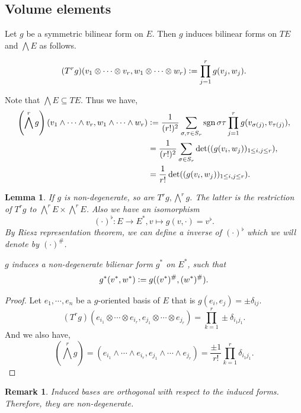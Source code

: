 \documentclass[8pt]{article}
\newtheorem{lemma}{Lemma}[section]
\newtheorem{remark}{Remark}[section]
\DeclareMathOperator{\sgn}{sgn}
\newcommand{\defeq}{\vcentcolon=}
\begin{document}
\subsection{Volume elements}
Let $g$ be a symmetric bilinear form on $E$. Then $g$ induces bilinear forms on $TE$ and $\bigwedge E$ as follows. 

\begin{equation*}
  (T^rg)(v_1\otimes\cdots\otimes v_r,w_1\otimes\cdots\otimes w_r) \defeq \prod_{j=1}^rg(v_j,w_j).
\end{equation*}

Note that $\bigwedge E\subseteq TE$. Thus we have,
\begin{align*}
  \left(\bigwedge^rg\right)(v_1\wedge\cdots\wedge v_r, w_1\wedge\cdots\wedge w_r) &\defeq {\frac 1 {(r!)^2}}\sum_{\sigma,\tau\in S_r}\sgn\sigma\tau\prod_{j=1}^rg(v_{\sigma(j)},v_{\tau(j)}),\\
  & = {\frac 1 {(r!)^2}}\sum_{\sigma\in S_r}\det((g(v_i,w_j))_{1\leq i,j\leq r}),\\
  & = {\frac 1 {r!}}\det((g(v_i,w_j))_{1\leq i,j\leq r}).
\end{align*}

\begin{lemma}
  \label{lemma_11_5}
  If $g$ is non-degenerate, so are $T^rg,\bigwedge^rg$. The latter is the restriction of $T^r g$ to $\bigwedge^r E\times\bigwedge^r E$. Also we have an isomorphism 
  \begin{equation*}
    (\cdot)^\flat:E\to E^*,v\mapsto g(v,\cdot) = v^\flat.
  \end{equation*}
   By Riesz representation theorem, we can define a inverse of $(\cdot)^\flat$ which we will denote by $(\cdot)^\#$. 
  \par $g$ induces a non-degenerate bilienar form $g^\ast$ on $E^*$, such that 
  \begin{equation*}
    g^*(v^*,w^*)\defeq g((v^*)^\#, (w^*)^\#).
  \end{equation*}
\end{lemma}

\begin{proof}
  Let $e_1,\cdots,e_n$ be a $g$-oriented basis of $E$ that is $g(e_i,e_j) = \pm\delta_{ij}$. 
  \begin{equation*}
    (T^rg)(e_{i_1}\otimes\cdots\otimes e_{i_r},e_{j_1}\otimes\cdots\otimes e_{j_r}) = \prod_{k=1}^r \pm\delta_{i_1j_1}.
  \end{equation*}
  And we also have,
  \begin{equation*}
    \left(\bigwedge^r g\right) = (e_{i_1}\wedge\cdots\wedge e_{i_r},e_{j_1}\wedge\cdots\wedge e_{j_r}) = {\frac {\pm1} {r!}}\prod_{k=1}^r \delta_{i_1j_1}.
  \end{equation*}
\end{proof}
  \begin{remark}
    Induced bases are orthogonal with respect to the induced forms. Therefore, they are non-degenerate.
  \end{remark}
\end{document}
